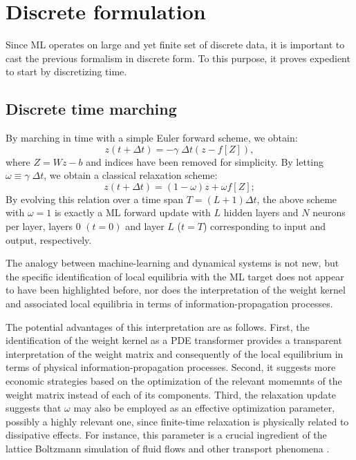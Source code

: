 \documentclass[15pt]{article}
\begin{document}

\section{Discrete formulation}

Since ML operates on large and yet finite set of discrete data, it is important
to cast the previous formalism in discrete form.
To this purpose, it proves expedient to start by discretizing time.

\subsection{Discrete time marching} 

By marching in time with a simple Euler forward scheme, we obtain:
\begin{equation}
\label{SYSDYN2}
z(t+\Delta t) = -\gamma \; \Delta t(z-f[Z]),
\end{equation}
where $Z=Wz-b$ and indices have been removed for simplicity.
By letting $\omega \equiv \gamma \; \Delta t$, we obtain 
a classical relaxation scheme:
\begin{equation}
\label{ML1}
z(t+\Delta t) = (1-\omega) z + \omega f[Z];
\end{equation}
By evolving this relation over a time span $T=(L+1)\Delta t$, the above scheme
with $\omega=1$ is exactly a ML forward update with $L$ hidden layers and $N$ neurons 
per layer, layers $0$ $(t=0)$ and layer $L$ ($t=T$) corresponding 
to input and output, respectively.

The analogy between machine-learning and dynamical systems is not new, but
the specific identification of local equilibria with the ML target does not
appear to have been highlighted before, nor does the interpretation of the weight
kernel and associated local equilibria in terms of information-propagation processes.

The potential advantages of this interpretation are as follows. 
First, the identification of the
weight kernel as a PDE transformer provides a transparent interpretation of the weight
matrix and consequently of the local equilibrium in terms 
of physical information-propagation processes. 
Second, it suggests more economic strategies based on the optimization of the relevant
momemnts of the weight matrix instead of each of its components.
Third, the relaxation update suggests that $\omega$ may also be 
employed as an effective optimization parameter, possibly a highly relevant one, since
finite-time relaxation is physically related to dissipative effects. 
For instance, this parameter is a crucial ingredient of the 
lattice Boltzmann simulation of fluid flows and other transport phenomena 
\cite{OUP01,RASIN,NATAL}. 
\end{document}
